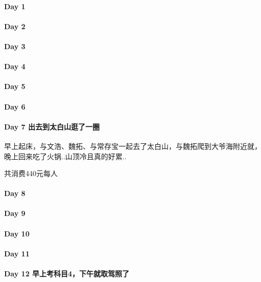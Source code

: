 \documentclass[UTF8,a4paper,8pt]{ctexart}
\begin{document}
 	 \paragraph{Day 1       \quad     }
 	 \paragraph{Day 2       \quad     }
 	 \paragraph{Day 3       \quad     }
 	 \paragraph{Day 4       \quad     }
 	 \paragraph{Day 5       \quad     }
 	 \paragraph{Day 6       \quad     }
 	 \paragraph{Day 7   出去到太白山逛了一圈    \quad     }
	 	 早上起床，与文浩、魏拓、与常存宝一起去了太白山，与魏拓爬到大爷海附近就，晚上回来吃了火锅..山顶冷且真的好累.. 
	 	 
	 	 共消费440元每人
 	 \paragraph{Day 8       \quad     }
 	 \paragraph{Day 9       \quad     }
 	 \paragraph{Day 10      \quad     }
 	 \paragraph{Day 11      \quad     }
 	 \paragraph{Day 12  早上考科目4，下午就取驾照了    \quad     }
\end{document}
